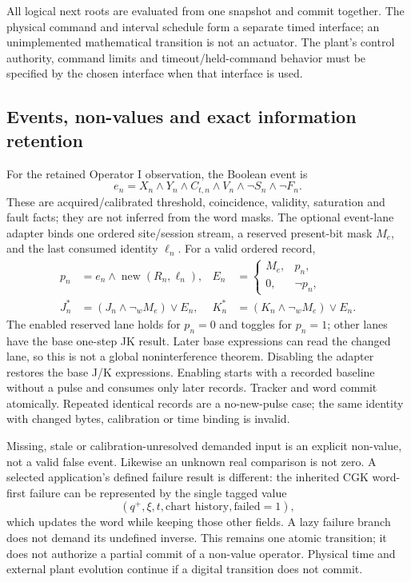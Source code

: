 All logical next roots are evaluated from one snapshot and commit together.
The physical command and interval schedule form a separate timed interface;
an unimplemented mathematical transition is not an actuator. The plant's
control authority, command limits and timeout/held-command behavior must be
specified by the chosen interface when that interface is used.

\subsection{Events, non-values and exact information retention}
For the retained Operator I observation, the Boolean event is
\begin{equation}
 e_n=X_n\land Y_n\land C_{t,n}\land V_n\land\neg S_n\land\neg F_n.
 \label{eq:r14-event}
\end{equation}
These are acquired/calibrated threshold, coincidence, validity, saturation and
fault facts; they are not inferred from the word masks. The optional event-lane
adapter binds one ordered site/session stream, a reserved present-bit mask
$M_e$, and the last consumed identity $\ell_n$. For a valid ordered record,
\begin{align}
 p_n&=e_n\land\operatorname{new}(R_n,\ell_n),&
 E_n&=\begin{cases}M_e,&p_n,\\0,&\neg p_n,\end{cases}\nonumber\\
 J_n^*&=(J_n\land\neg_w M_e)\lor E_n,&
 K_n^*&=(K_n\land\neg_w M_e)\lor E_n.
 \label{eq:r14-event-lane}
\end{align}
The enabled reserved lane holds for $p_n=0$ and toggles for $p_n=1$; other lanes
have the base one-step JK result. Later base expressions can read the changed
lane, so this is not a global noninterference theorem. Disabling the adapter
restores the base J/K expressions. Enabling starts with a recorded baseline
without a pulse and consumes only later records. Tracker and word commit
atomically. Repeated identical records are a no-new-pulse case; the same
identity with changed bytes, calibration or time binding is invalid.

Missing, stale or calibration-unresolved demanded input is an explicit
non-value, not a valid false event. Likewise an unknown real comparison is not
zero. A selected application's defined failure result is different: the
inherited CGK word-first failure can be represented by the single tagged value
\begin{equation}
 (q^+,\xi,t,\text{chart history},\mathrm{failed}=1),
 \label{eq:r14-tagged-failure}
\end{equation}
which updates the word while keeping those other fields. A lazy failure branch
does not demand its undefined inverse. This remains one atomic transition; it
does not authorize a partial commit of a non-value operator. Physical time and
external plant evolution continue if a digital transition does not commit.

